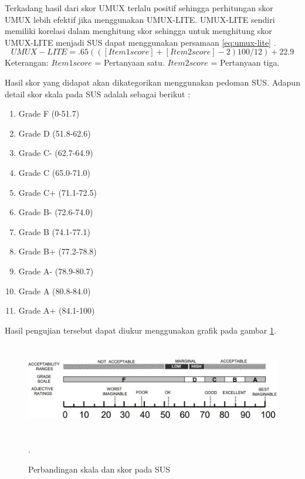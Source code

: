 \par Terkadang hasil dari skor UMUX terlalu positif sehingga perhitungan skor UMUX lebih efektif jika menggunakan UMUX-LITE. UMUX-LITE sendiri memiliki korelasi dalam menghitung skor sehingga untuk menghitung skor UMUX-LITE menjadi SUS dapat menggunakan persamaan \ref{eq:umux-lite} \citep{Borsci2015}.
\begin{equation}
	\label{eq:umux-lite}
	UMUX - LITE = .65(([Item1score] + [Item2score] - 2)100/12) + 22.9
\end{equation}
Keterangan:\newline
$Item1score$ = Pertanyaan satu.\newline
$Item2score$ = Pertanyaan tiga.\newline


\par Hasil skor yang didapat akan dikategorikan menggunakan pedoman SUS. Adapun detail skor skala pada SUS adalah sebagai berikut \citep{Borsci2015} :
\begin{enumerate}[1.]
	\item Grade F (0-51.7)
	\item Grade D (51.8-62.6)
	\item Grade C- (62.7-64.9)
	\item Grade C (65.0-71.0)
	\item Grade C+ (71.1-72.5)
	\item Grade B- (72.6-74.0)
	\item Grade B (74.1-77.1)
	\item Grade B+ (77.2-78.8)
	\item Grade A- (78.9-80.7)
	\item Grade A (80.8-84.0)
	\item Grade A+ (84.1-100)
\end{enumerate}

Hasil pengujian tersebut dapat diukur menggunakan grafik pada gambar \ref{grafikumuxlite}.



\begin{figure}[H]
	\centering
	\shadowbox
	{\includegraphics [width = 12cm, height= 4cm]{gambar/umux.jpg}}
	\caption{Perbandingan skala dan skor pada SUS}.
	\label{grafikumuxlite}
\end{figure}